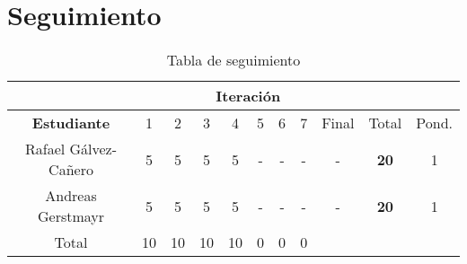 \section{Seguimiento}

\begin{table}[htdp]
\begin{center}
\begin{tabular}{|c|c|c|c|c|c|c|c|c|c|c|}
\cline{2-9}
\multicolumn{1}{c}{}&\multicolumn{8}{|c|}{\textbf{Iteración}}&\multicolumn{2}{c}{}\\
\hline
\textbf{Estudiante}&1&2&3&4&5&6&7&Final&Total&Pond.\\
\hline
Rafael Gálvez-Cañero&5&5&5&5&-&-&-&-&\textbf{20}&1\\
Andreas Gerstmayr   &5&5&5&5&-&-&-&-&\textbf{20}&1\\
\hline
Total               &10&10&10&10&0&0&0&\multicolumn{2}{c}{}\\
\cline{1-8}
\end{tabular}
\end{center}
\caption{Tabla de seguimiento}
\label{tab:seguimiento}
\end{table}%
